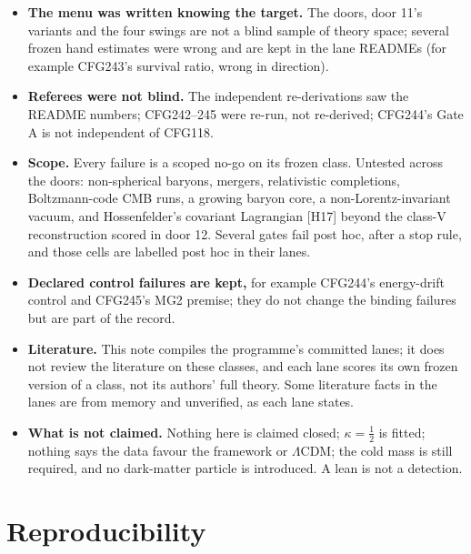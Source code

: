 \documentclass[10pt]{article}
\begin{document}
\begin{itemize}
\item \textbf{The menu was written knowing the target.} The doors, door 11's variants and the four swings are not a blind sample of theory space; several frozen hand estimates were wrong and are kept in the lane READMEs (for example CFG243's survival ratio, wrong in direction).
\item \textbf{Referees were not blind.} The independent re-derivations saw the README numbers; CFG242--245 were re-run, not re-derived; CFG244's Gate A is not independent of CFG118.
\item \textbf{Scope.} Every failure is a scoped no-go on its frozen class. Untested across the doors: non-spherical baryons, mergers, relativistic completions, Boltzmann-code CMB runs, a growing baryon core, a non-Lorentz-invariant vacuum, and Hossenfelder's covariant Lagrangian [H17] beyond the class-V reconstruction scored in door 12. Several gates fail post hoc, after a stop rule, and those cells are labelled post hoc in their lanes.
\item \textbf{Declared control failures are kept,} for example CFG244's energy-drift control and CFG245's MG2 premise; they do not change the binding failures but are part of the record.
\item \textbf{Literature.} This note compiles the programme's committed lanes; it does not review the literature on these classes, and each lane scores its own frozen version of a class, not its authors' full theory. Some literature facts in the lanes are from memory and unverified, as each lane states.
\item \textbf{What is not claimed.} Nothing here is claimed closed; $\kappa=\tfrac12$ is fitted; nothing says the data favour the framework or $\Lambda$CDM; the cold mass is still required, and no dark-matter particle is introduced. A lean is not a detection.
\end{itemize}

\section{Reproducibility}\label{sec:rep}
\end{document}
